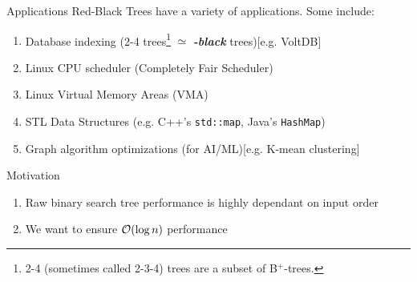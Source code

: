 \documentclass[aspectratio=169]{beamer}
\title{\color{black}{Balanced Trees (\textib{\color{red}{Red}}\textib{-Black} Trees)}}
\author{Warren Kim}
\date{}
\newcommand{\textib}[1]{\textit{\textbf{{#1}}}}
\begin{document}
\maketitle

\begin{frame}{Applications}
    Red-Black Trees have a variety of applications. Some include:
    \begin{enumerate}[label=\textit{(\roman*)}]
        \item Database indexing (2-4 trees\footnote{2-4 (sometimes called 2-3-4) trees are a subset
            of B$^+$-trees.} $\simeq$ \textib{\color{red}{red}}\textib{-black} trees)[e.g. VoltDB]
        \item<2-> Linux CPU scheduler (Completely Fair Scheduler)
        \item<3-> Linux Virtual Memory Areas (VMA)
        \item<4-> STL Data Structures (e.g. C++'s \texttt{std::map}, Java's \texttt{HashMap})
        \item<5-> Graph algorithm optimizations (for AI/ML)[e.g. K-mean clustering]
    \end{enumerate}
\end{frame}

\begin{frame}{Motivation}
    \begin{enumerate}[label=\textit{(\roman*)}]
        \item Raw binary search tree performance is highly dependant on input order
        \item We want to ensure ${\cal{O}}(\log n)$ performance
    \end{enumerate}
\end{frame}
\end{document}
